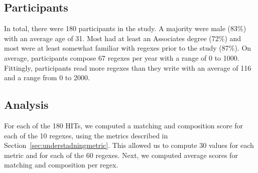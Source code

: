 \subsection{Participants}

In total, there were 180 participants in the study.
A majority were male (83\%) with an average age of 31. Most had
at least an Associates degree (72\%) and most were at least somewhat familiar with regexes prior to the study (87\%). On average,
participants compose 67 regexes per year with a range of 0 to 1000. Fittingly, participants read more regexes than they write with an average of 116 and a range from 0 to 2000.






\subsection{Analysis}
For each of the 180 HITs, we computed a matching and composition score for each of the 10 regexes, using the metrics described in Section~\ref{sec:understadningmetric}. This allowed us to compute 30 values for each metric and for each of the 60 regexes. Next, we computed average scores for matching and composition per regex.

